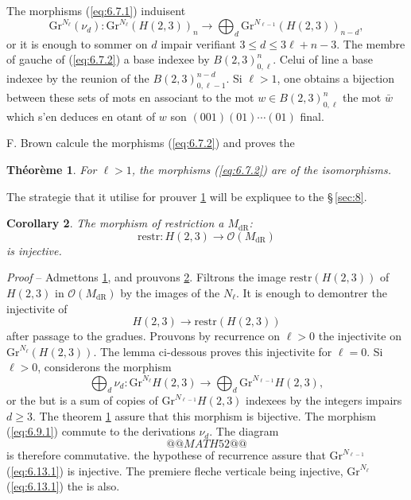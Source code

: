 \documentclass[11pt,a4paper]{article}
\theoremstyle{plain}
\newtheorem{theorem}{Th\'eor\`eme}
\newtheorem{corollary}[theorem]{Corollary}
\theoremstyle{definition}
\newcommand{\dR}{\mathrm{dR}}
\newcommand{\Gr}{\mathrm{Gr}}
\begin{document}
The morphisms (\ref{eq:6.7.1}) induisent
\begin{equation}\label{eq:6.7.2}
\Gr^{N_{\ell}}(\nu_d): \Gr^{N_{\ell}}(H(2,3))_n \to \bigoplus_d \Gr^{N_{\ell-1}}(H(2,3))_{n-d},
\end{equation}
or it is enough to sommer on $d$ impair verifiant $3 \leq d \leq 3\ell + n - 3$. The membre of gauche of (\ref{eq:6.7.2}) a base indexee by $B(2,3)_{0,\ell}^n$. Celui of line a base indexee by the reunion of the $B(2,3)_{0,\ell-1}^{n-d}$. Si $\ell > 1$, one obtains a bijection between these sets of mots en associant to the mot $w \in B(2,3)_{0,\ell}^n$ the mot $\bar{w}$ which s'en deduces en otant of $w$ son $(001)(01)\cdots(01)$ final.

F. Brown calcule the morphisms (\ref{eq:6.7.2}) and proves the

\begin{theorem}\label{thm:6.8}
For $\ell > 1$, the morphisms (\ref{eq:6.7.2}) are of the isomorphisms.
\end{theorem}

The strategie that it utilise for prouver \ref{thm:6.8} will be expliquee to the \S\,\ref{sec:8}.

\begin{corollary}\label{cor:6.9}
The morphism of restriction a $M_{\dR}$:
\begin{equation}\label{eq:6.9.1}
\mathrm{restr}: H(2,3) \to \mathcal{O}(M_{\dR})
\end{equation}
is injective.
\end{corollary}

\noindent \textit{Proof} -- Admettons \ref{thm:6.8}, and prouvons \ref{cor:6.9}. Filtrons the image $\mathrm{restr}(H(2,3))$ of $H(2,3)$ in $\mathcal{O}(M_{\dR})$ by the images of the $N_{\ell}$. It is enough to demontrer the injectivite of
\begin{equation}\label{eq:6.13.1}
H(2,3) \to \mathrm{restr}(H(2,3))
\end{equation}
after passage to the gradues. Prouvons by recurrence on $\ell > 0$ the injectivite on $\Gr^{N_{\ell}}(H(2,3))$. The lemma ci-dessous proves this injectivite for $\ell = 0$. Si $\ell > 0$, considerons the morphism
\[
\bigoplus_d \nu_d: \Gr^{N_{\ell}} H(2,3) \to \bigoplus_d \Gr^{N_{\ell-1}} H(2,3),
\]
or the but is a sum of copies of $\Gr^{N_{\ell-1}} H(2,3)$ indexees by the integers impairs $d \geq 3$. The theorem \ref{thm:6.8} assure that this morphism is bijective. The morphism (\ref{eq:6.9.1}) commute to the derivations $\nu_d$. The diagram
\[
@@MATH52@@
\]
is therefore commutative. the hypothese of recurrence assure that $\Gr^{N_{\ell-1}}$(\ref{eq:6.13.1}) is injective. The premiere fleche verticale being injective, $\Gr^{N_{\ell}}$(\ref{eq:6.13.1}) the is also.
\end{document}
